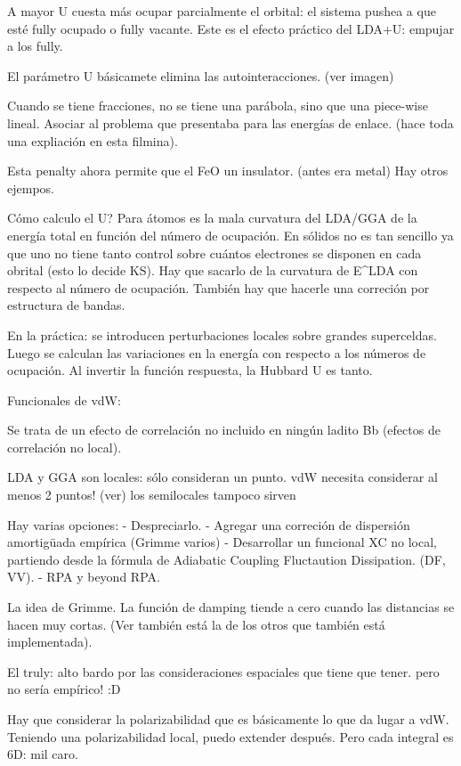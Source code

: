   A mayor U cuesta más ocupar parcialmente el orbital: el sistema pushea a que esté fully ocupado o fully vacante. Este es el efecto práctico del LDA+U: empujar a los fully.

  El parámetro U básicamete elimina las autointeracciones. (ver imagen)

  Cuando se tiene fracciones, no se tiene una parábola, sino que una piece-wise lineal. Asociar al problema que presentaba para las energías de enlace. (hace toda una expliación en esta filmina).

  Esta penalty ahora permite que el FeO un insulator. (antes era metal) Hay otros ejempos.

  Cómo calculo el U? Para átomos es la mala curvatura del LDA/GGA de la energía total en función del número de ocupación. En sólidos no es tan sencillo ya que uno no tiene tanto control sobre cuántos electrones se disponen en cada obrital (esto lo decide KS). Hay que sacarlo de la curvatura de E^LDA con respecto al número de ocupación. También hay que hacerle una correción por estructura de bandas.

  En la práctica: se introducen perturbaciones locales sobre grandes superceldas. Luego se calculan las variaciones en la energía con respecto a los números de ocupación. Al invertir la función respuesta, la Hubbard U es tanto.

  Funcionales de vdW:

  Se trata de un efecto de correlación no incluido en ningún ladito Bb (efectos de correlación no local).

  LDA y GGA son locales: sólo consideran un punto. vdW necesita considerar al menos 2 puntos! (ver) los semilocales tampoco sirven

  Hay varias opciones:
  - Despreciarlo.
  - Agregar una correción de dispersión amortigüada empírica (Grimme varios)
  - Desarrollar un funcional XC no local, partiendo desde la fórmula de Adiabatic Coupling Fluctaution Dissipation. (DF, VV).
  - RPA y beyond RPA.

  La idea de Grimme. La función de damping tiende a cero cuando las distancias se hacen muy cortas. (Ver también está la de los otros que también está implementada).

  El truly: alto bardo por las consideraciones espaciales que tiene que tener. pero no sería empírico! :D

  Hay que considerar la polarizabilidad que es básicamente lo que da lugar a vdW. Teniendo una polarizabilidad local, puedo extender después. Pero cada integral es 6D: mil caro.

